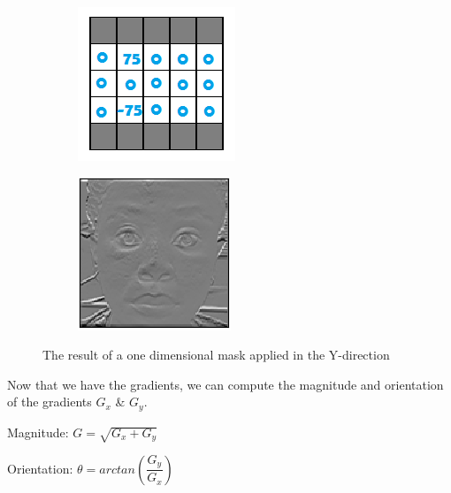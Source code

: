 \begin{figure}[H]
\centering
\begin{subfigure}{.5\textwidth}
  \centering
  \includegraphics[width=.4\linewidth]{gy}
  \label{fig:sub1}
\end{subfigure}%
\begin{subfigure}{.5\textwidth}
  \centering
  \includegraphics[width=.4\linewidth]{dy}
  \label{fig:sub2}
\end{subfigure}
\caption{The result of a one dimensional mask applied in the Y-direction}
\label{fig:test}
\end{figure}


Now that we have the gradients, we can compute the magnitude and orientation of the gradients $G_x$ \& $G_y$.

Magnitude: $G = \sqrt{G_x + G_y}$

Orientation: $\theta = arctan(\dfrac{G_y}{G_x})$

